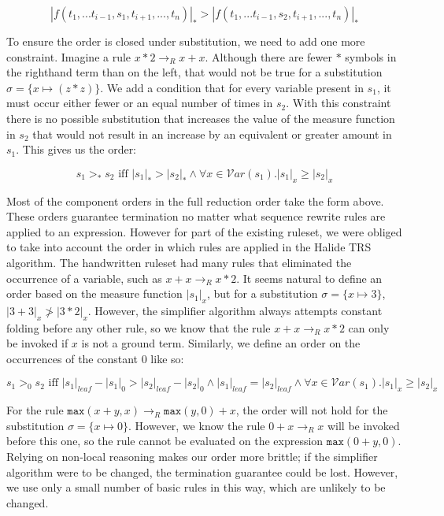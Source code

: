 \documentclass[acmsmall,review,anonymous]{acmart}\settopmatter{printfolios=true,printccs=false,printacmref=false}
\begin{document}
\[
|f(t_1,...t_{i-1},s_1,t_{i+1},...,t_n)|_* > |f(t_1,...t_{i-1},s_2,t_{i+1},...,t_n)|_*
\]

To ensure the order is closed under substitution, we need to add one more constraint. Imagine a rule $x * 2 \rightarrow_R x + x$. Although there are fewer $*$ symbols in the righthand term than on the left, that would not be true for a substitution $\sigma = \{x \mapsto (z * z)\}$. We add a condition that for every variable present in $s_1$, it must occur either fewer or an equal number of times in $s_2$. With this constraint there is no possible substitution that increases the value of the measure function in $s_2$ that would not result in an increase by an equivalent or greater amount in $s_1$. This gives us the order:

\[
s_1 >_* s_2 \textrm{ iff } |s_1|_* > |s_2|_* \wedge \forall x \in \mathcal{V}ar(s_1) . |s_1|_x \geq |s_2|_x
\]

Most of the component orders in the full reduction order take the form above. These orders guarantee termination no matter what sequence rewrite rules are applied to an expression. However for part of the existing ruleset, we were obliged to take into account the order in which rules are applied in the Halide TRS algorithm. The handwritten ruleset had many rules that eliminated the occurrence of a variable, such as $x + x \rightarrow_R x * 2$. It seems natural to define an order based on the measure function $|s_1|_x$, but for a substitution $\sigma = \{x \mapsto 3\}$, $|3 + 3|_x \not > |3 * 2|_x$. However, the simplifier algorithm always attempts constant folding before any other rule, so we know that the rule $x + x \rightarrow_R x * 2$ can only be invoked if $x$ is not a ground term. Similarly, we define an order on the occurrences of the constant 0 like so:

\[
s_1 >_0 s_2 \textrm { iff } |s_1|_{leaf} - |s_1|_0 > |s_2|_{leaf} - |s_2|_0 \wedge |s_1|_{leaf} = |s_2|_{leaf} \wedge \forall x \in \mathcal{V}ar(s_1) . |s_1|_x \geq |s_2|_x
\]

For the rule $\texttt{max}(x + y, x) \rightarrow_R \texttt{max}(y, 0) + x$, the order will not hold for the substitution $\sigma = \{x \mapsto 0\}$. However, we know the rule $0 + x \rightarrow_R x$ will be invoked before this one, so the rule cannot be evaluated on the expression $\texttt{max}(0 + y, 0)$. Relying on non-local reasoning makes our order more brittle; if the simplifier algorithm were to be changed, the termination guarantee could be lost. However, we use only a small number of basic rules in this way, which are unlikely to be changed.
\end{document}
